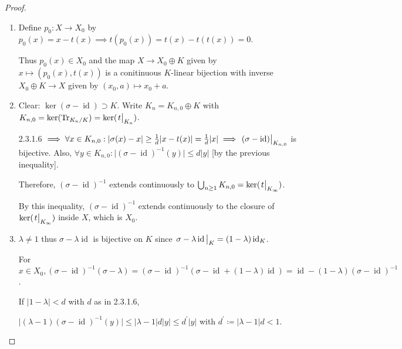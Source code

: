 \documentclass{article}
\theoremstyle{definition}
\numberwithin{theorem}{subsection}
\begin{document}
    \begin{proof}
        \begin{enumerate}[label=\alph*)]
            \item Define \(p_0: X \to X_0\) by \(p_0(x) = x - t(x) \implies t(p_0(x)) = t(x) - t(t(x)) = 0\).
            
            Thus \(p_0(x) \in X_0\) and the map \(X \to X_0 \oplus K\) given by \(x \mapsto (p_0(x),t(x))\) is a conitinuous \(K\)-linear bijection with inverse \(X_0 \oplus K \to X\) given by \((x_0,a) \mapsto x_0 + a\).

            \item Clear: \(\ker (\sigma - \operatorname{id}) \supset K\). Write \(K_n = K_{n,0} \oplus K\) with \(K_{n,0}= \ker(\Tr_{K_n / K}) = \ker(\eval{t}_{K_n})\).
            
            2.3.1.6 \(\implies \forall x\in K_{n,0} : \vert \sigma(x) - x \vert \geq \frac{1}{d} \vert x - t(x) \vert = \frac{1}{d} \vert x \vert \implies \eval{(\sigma - \operatorname{id})}_{K_{n,0}}\) is bijective. Also, \(\forall y\in K_{n,0} : \vert (\sigma - \operatorname{id})^{-1} (y) \vert \leq d \vert y \vert \) [by the previous inequality].
            
            Therefore, \((\sigma - \operatorname{id}) ^{-1}\) extends continuously to \(\bigcup_{n \geq 1} K_{n,0} = \ker(\eval{t}_{K_\infty})\).
            
            By this inequality, \((\sigma - \operatorname{id}) ^{-1} \) extends continuously to the closure of \(\ker(\eval{t}_{K_\infty})\) inside \(X\), which is \(X_0\).

            \item \(\lambda \neq 1\) thus \(\sigma - \lambda \operatorname{id}\) is bijective on \(K\) since \(\eval{\sigma - \lambda \operatorname{id}}_K = (1-\lambda) \operatorname{id}_{K} \).
            
            For \(x\in X_0, (\sigma - \operatorname{id}) ^{-1} (\sigma - \lambda) = (\sigma - \operatorname{id})^{-1} (\sigma - \operatorname{id} + (1-\lambda) \operatorname{id}) = \operatorname{id} - (1-\lambda) (\sigma - \operatorname{id}) ^{-1}\).
            
            If \(\vert 1-\lambda \vert < d\) with \(d\) as in 2.3.1.6,

            \(\vert (\lambda - 1) (\sigma - \operatorname{id})^{-1} (y)\vert \leq \vert \lambda - 1 \vert d \vert y \vert \leq d^{\prime} \vert y \vert\) with \(d^{\prime} \coloneqq \vert \lambda -1 \vert d < 1\).


\end{enumerate}
\end{proof}
\end{document}
